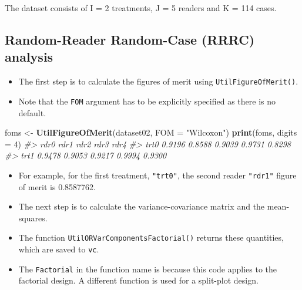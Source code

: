 \documentclass[
]{book}
\newenvironment{Shaded}{\begin{snugshade}}{\end{snugshade}}
\newcommand{\CommentTok}[1]{\textcolor[rgb]{0.56,0.35,0.01}{\textit{#1}}}
\newcommand{\DataTypeTok}[1]{\textcolor[rgb]{0.13,0.29,0.53}{#1}}
\newcommand{\DecValTok}[1]{\textcolor[rgb]{0.00,0.00,0.81}{#1}}
\newcommand{\KeywordTok}[1]{\textcolor[rgb]{0.13,0.29,0.53}{\textbf{#1}}}
\newcommand{\NormalTok}[1]{#1}
\newcommand{\StringTok}[1]{\textcolor[rgb]{0.31,0.60,0.02}{#1}}
\providecommand{\tightlist}{%
  \setlength{\itemsep}{0pt}\setlength{\parskip}{0pt}}
\begin{document}
The dataset consists of I = 2 treatments, J = 5 readers and K = 114 cases.

\hypertarget{ORApplications-RRRC-dataset02-hand}{%
\subsection{Random-Reader Random-Case (RRRC) analysis}\label{ORApplications-RRRC-dataset02-hand}}

\begin{itemize}
\tightlist
\item
  The first step is to calculate the figures of merit using \texttt{UtilFigureOfMerit()}.
\item
  Note that the \texttt{FOM} argument has to be explicitly specified as there is no default.
\end{itemize}

\begin{Shaded}
\begin{Highlighting}[]
\NormalTok{foms \textless{}{-}}\StringTok{ }\KeywordTok{UtilFigureOfMerit}\NormalTok{(dataset02, }\DataTypeTok{FOM =} \StringTok{"Wilcoxon"}\NormalTok{)}
\KeywordTok{print}\NormalTok{(foms, }\DataTypeTok{digits =} \DecValTok{4}\NormalTok{)}
\CommentTok{\#\textgreater{}        rdr0   rdr1   rdr2   rdr3   rdr4}
\CommentTok{\#\textgreater{} trt0 0.9196 0.8588 0.9039 0.9731 0.8298}
\CommentTok{\#\textgreater{} trt1 0.9478 0.9053 0.9217 0.9994 0.9300}
\end{Highlighting}
\end{Shaded}

\begin{itemize}
\tightlist
\item
  For example, for the first treatment, \texttt{"trt0"}, the second reader \texttt{"rdr1"} figure of merit is 0.8587762.
\item
  The next step is to calculate the variance-covariance matrix and the mean-squares.
\item
  The function \texttt{UtilORVarComponentsFactorial()} returns these quantities, which are saved to \texttt{vc}.
\item
  The \texttt{Factorial} in the function name is because this code applies to the factorial design. A different function is used for a split-plot design.
\end{itemize}
\end{document}
